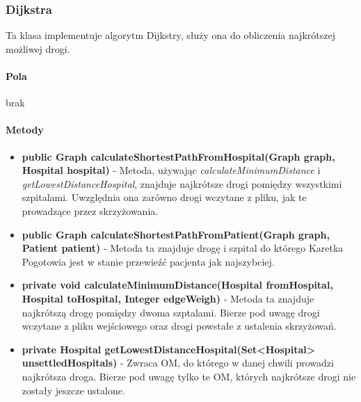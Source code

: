 \documentclass[]{article}
\begin{document}
                
            \subsubsection{Dijkstra} 
            Ta klasa implementuje algorytm Dijkstry, służy ona do obliczenia najkrótszej możliwej drogi.
                
                \paragraph{Pola}
                     brak
                    
                \paragraph{Metody}
                    \begin{itemize}
                        \item \textbf{public Graph calculateShortestPathFromHospital(Graph graph, Hospital hospital)} - 
                            Metoda, używając \textit{calculateMinimumDistance} i \textit{getLowestDistanceHospital}, 
                            znajduje najkrótsze drogi pomiędzy wszystkimi szpitalami. Uwzględnia ona zarówno drogi wczytane z 
                            pliku, jak te prowadzące przez skrzyżowania.
                        \item \textbf{public Graph calculateShortestPathFromPatient(Graph graph, Patient patient)} - 
                            Metoda ta znajduje drogę i szpital do którego Karetka Pogotowia jest w stanie przewieźć pacjenta jak najszybciej.
                        \item \textbf{private void calculateMinimumDistance(Hospital fromHospital, Hospital toHospital, Integer edgeWeigh)} - 
                            Metoda ta znajduje najkrótszą drogę pomiędzy dwoma szptalami. Bierze pod uwagę drogi 
                            wczytane z pliku wejściowego oraz drogi powstałe z ustalenia skrzyżowań.
                        \item \textbf{private Hospital getLowestDistanceHospital(Set<Hospital> unsettledHospitals)} - 
                            Zwraca OM, do którego w danej chwili prowadzi najkrótsza droga. Bierze pod uwagę tylko te OM, 
                            których najkrótsze drogi nie zostały jeszcze ustalone.
                    \end{itemize}
                
\end{document}
